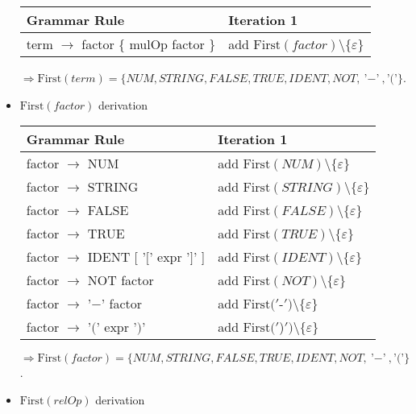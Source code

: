 \documentclass[8pt]{scrartcl}
\newcommand{\First}[1]{\mathrm{First}(#1)}
\newcommand{\epsset}{\{\varepsilon\}}
\begin{document}
\begin{itemize}
                \begin{tabular}{|l |l |}
                    \hline
                    \textbf{Grammar Rule} & \textbf{Iteration 1}\\
                    \hline
                    term $\rightarrow$ factor \{ mulOp factor \} & add $\First{factor} \setminus \epsset$\\
                    \hline
                \end{tabular}\newline
                $\Rightarrow \First{term} = \{NUM, STRING, FALSE, TRUE, IDENT, NOT, \text{'$-$'}, \text{'$($'}\}$.
            \item $\First{factor}$ derivation\newline
                \begin{tabular}{|l |l |}
                    \hline
                    \textbf{Grammar Rule} & \textbf{Iteration 1}\\
                    \hline
                    factor $\rightarrow$ NUM & add $\First{NUM} \setminus \epsset$\\
                    \hline
                    factor $\rightarrow$ STRING & add $\First{STRING} \setminus \epsset$\\
                    \hline
                    factor $\rightarrow$ FALSE & add $\First{FALSE} \setminus \epsset$\\
                    \hline
                    factor $\rightarrow$ TRUE & add $\First{TRUE} \setminus \epsset$\\
                    \hline
                    factor $\rightarrow$ IDENT [ '$[$' expr '$]$' ] & add $\First{IDENT} \setminus \epsset$\\
                    \hline
                    factor $\rightarrow$ NOT factor & add $\First{NOT} \setminus \epsset$\\
                    \hline
                    factor $\rightarrow$ '$-$' factor & add $\First{'$-$'} \setminus \epsset$\\
                    \hline
                    factor $\rightarrow$ '$($' expr '$)$' & add $\First{'$)$'} \setminus \epsset$\\
                    \hline
                \end{tabular}\newline
                $\Rightarrow \First{factor} = \{NUM, STRING, FALSE, TRUE, IDENT, NOT, \text{'$-$'}, \text{'$($'}\}$.
            \item $\First{relOp}$ derivation\newline

\end{itemize}
\end{document}
